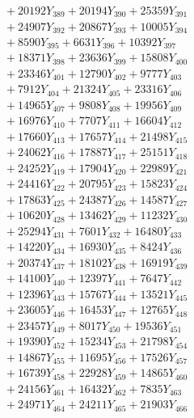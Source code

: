 \documentclass[a4paper,10pt]{article}
\begin{document}
{\begin{align}
&\;  + 20192 Y_{389} + 20194 Y_{390} + 25359 Y_{391} \\[0.3ex]
&\;  + 24907 Y_{392} + 20867 Y_{393} + 10005 Y_{394} \\[0.3ex]
&\;  + 8590 Y_{395} + 6631 Y_{396} + 10392 Y_{397} \\[0.3ex]
&\;  + 18371 Y_{398} + 23636 Y_{399} + 15808 Y_{400} \\[0.3ex]
&\;  + 23346 Y_{401} + 12790 Y_{402} + 9777 Y_{403} \\[0.3ex]
&\;  + 7912 Y_{404} + 21324 Y_{405} + 23316 Y_{406} \\[0.3ex]
&\;  + 14965 Y_{407} + 9808 Y_{408} + 19956 Y_{409} \\[0.3ex]
&\;  + 16976 Y_{410} + 7707 Y_{411} + 16604 Y_{412} \\[0.3ex]
&\;  + 17660 Y_{413} + 17657 Y_{414} + 21498 Y_{415} \\[0.3ex]
&\;  + 24062 Y_{416} + 17887 Y_{417} + 25151 Y_{418} \\[0.5ex]\allowbreak
&\;  + 24252 Y_{419} + 17904 Y_{420} + 22989 Y_{421} \\[0.3ex]
&\;  + 24416 Y_{422} + 20795 Y_{423} + 15823 Y_{424} \\[0.3ex]
&\;  + 17863 Y_{425} + 24387 Y_{426} + 14587 Y_{427} \\[0.3ex]
&\;  + 10620 Y_{428} + 13462 Y_{429} + 11232 Y_{430} \\[0.3ex]
&\;  + 25294 Y_{431} + 7601 Y_{432} + 16480 Y_{433} \\[0.3ex]
&\;  + 14220 Y_{434} + 16930 Y_{435} + 8424 Y_{436} \\[0.3ex]
&\;  + 20374 Y_{437} + 18102 Y_{438} + 16919 Y_{439} \\[0.3ex]
&\;  + 14100 Y_{440} + 12397 Y_{441} + 7647 Y_{442} \\[0.3ex]
&\;  + 12396 Y_{443} + 15767 Y_{444} + 13521 Y_{445} \\[0.3ex]
&\;  + 23605 Y_{446} + 16453 Y_{447} + 12765 Y_{448} \\[0.5ex]\allowbreak
&\;  + 23457 Y_{449} + 8017 Y_{450} + 19536 Y_{451} \\[0.3ex]
&\;  + 19390 Y_{452} + 15234 Y_{453} + 21798 Y_{454} \\[0.3ex]
&\;  + 14867 Y_{455} + 11695 Y_{456} + 17526 Y_{457} \\[0.3ex]
&\;  + 16739 Y_{458} + 22928 Y_{459} + 14865 Y_{460} \\[0.3ex]
&\;  + 24156 Y_{461} + 16432 Y_{462} + 7835 Y_{463} \\[0.3ex]
&\;  + 24971 Y_{464} + 24211 Y_{465} + 21903 Y_{466} \\[0.3ex]

\end{align}}
\end{document}
